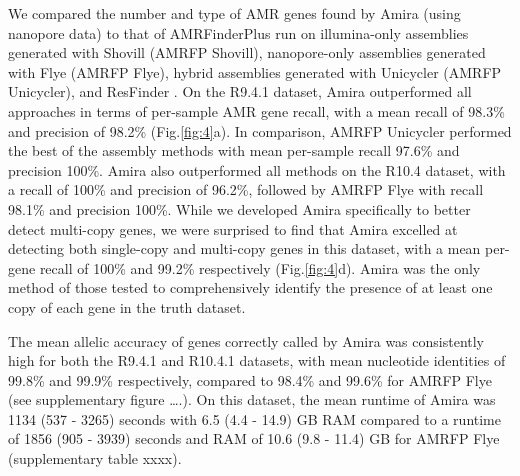 We compared the number and type of AMR genes found by Amira (using nanopore data) to that of AMRFinderPlus run on illumina-only assemblies generated with Shovill \cite{Shovill, Bankevich2012} (AMRFP Shovill), nanopore-only assemblies generated with Flye \cite{Kolmogorov2019} (AMRFP Flye), hybrid assemblies generated with Unicycler \cite{Wick2017} (AMRFP Unicycler), and ResFinder \cite{Florensa2022}. On the R9.4.1 dataset, Amira outperformed all approaches in terms of per-sample AMR gene recall, with a mean recall of 98.3\% and precision of 98.2\% (Fig.\ref{fig:4}a). In comparison, AMRFP Unicycler performed the best of the assembly methods with mean per-sample recall 97.6\% and precision 100\%. Amira also outperformed all methods on the R10.4 dataset, with a recall of 100\% and precision of 96.2\%, followed by AMRFP Flye with recall 98.1\% and precision 100\%. While we developed Amira specifically to better detect multi-copy genes, we were surprised to find that Amira excelled at detecting both single-copy and multi-copy genes in this dataset, with a mean per-gene recall of 100\% and 99.2\% respectively (Fig.\ref{fig:4}d). Amira was the only method of those tested to comprehensively identify the presence of at least one copy of each gene in the truth dataset.

The mean allelic accuracy of genes correctly called by Amira was consistently high for both the R9.4.1 and R10.4.1 datasets, with mean nucleotide identities of 99.8\% and 99.9\% respectively, compared to 98.4\% and 99.6\% for AMRFP Flye (see supplementary figure ….). On this dataset, the mean runtime of Amira was 1134 (537 - 3265) seconds with 6.5 (4.4 - 14.9) GB RAM compared to a runtime of 1856 (905 - 3939) seconds and RAM of 10.6 (9.8 - 11.4) GB for AMRFP Flye (supplementary table xxxx). 

